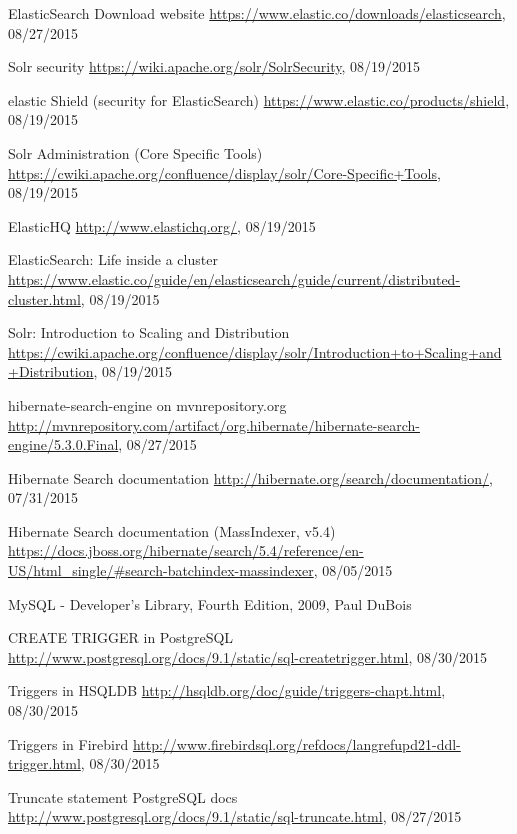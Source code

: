 \begin{thebibliography}{100}
	 ElasticSearch Download website
	\url{https://www.elastic.co/downloads/elasticsearch}, 08/27/2015
	
	 Solr security
	\url{https://wiki.apache.org/solr/SolrSecurity}, 08/19/2015
	
	 elastic Shield (security for ElasticSearch)
	\url{https://www.elastic.co/products/shield}, 08/19/2015
	
	 Solr Administration (Core Specific Tools)
	\url{https://cwiki.apache.org/confluence/display/solr/Core-Specific+Tools}, 08/19/2015
	
	 ElasticHQ
	\url{http://www.elastichq.org/}, 08/19/2015
	
	 ElasticSearch: Life inside a cluster
	\url{https://www.elastic.co/guide/en/elasticsearch/guide/current/distributed-cluster.html}, 08/19/2015
	
	 Solr: Introduction to Scaling and Distribution
	\url{https://cwiki.apache.org/confluence/display/solr/Introduction+to+Scaling+and+Distribution}, 08/19/2015
	
	 hibernate-search-engine on mvnrepository.org
	\url{http://mvnrepository.com/artifact/org.hibernate/hibernate-search-engine/5.3.0.Final}, 08/27/2015
	
	 Hibernate Search documentation
	\url{http://hibernate.org/search/documentation/}, 07/31/2015
	
	 Hibernate Search documentation (MassIndexer, v5.4)
	\url{https://docs.jboss.org/hibernate/search/5.4/reference/en-US/html_single/#search-batchindex-massindexer}, 08/05/2015
	
	 MySQL - Developer's Library, Fourth Edition, 2009, Paul DuBois
	
	 CREATE TRIGGER in PostgreSQL
	\url{http://www.postgresql.org/docs/9.1/static/sql-createtrigger.html}, 08/30/2015
	
	 Triggers in HSQLDB
	\url{http://hsqldb.org/doc/guide/triggers-chapt.html}, 08/30/2015
	
	 Triggers in Firebird
	\url{http://www.firebirdsql.org/refdocs/langrefupd21-ddl-trigger.html}, 08/30/2015
	
	 Truncate statement PostgreSQL docs
	\url{http://www.postgresql.org/docs/9.1/static/sql-truncate.html}, 08/27/2015
	

\end{thebibliography}
